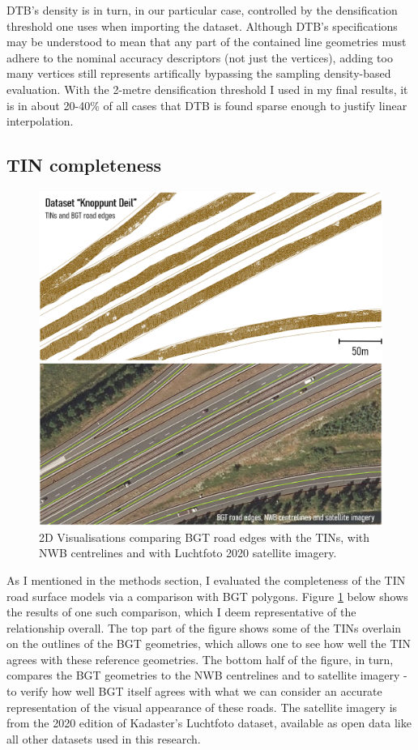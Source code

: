 DTB's density is in turn, in our particular case, controlled by the densification threshold one uses when importing the dataset. Although DTB's specifications may be understood to mean that any part of the contained line geometries must adhere to the nominal accuracy descriptors (not just the vertices), adding too many vertices still represents artifically bypassing the sampling density-based evaluation. With the 2-metre densification threshold I used in my final results, it is in about 20-40\% of all cases that DTB is found sparse enough to justify linear interpolation.

\subsection{TIN completeness}
\label{sub:tincompleteness}

\begin{figure}
    \centering
    \includegraphics[width=0.9\linewidth]{final_report/figs/bgtcomparison.png}
    \caption{2D Visualisations comparing BGT road edges with the TINs, with NWB centrelines and with Luchtfoto 2020 satellite imagery.}
    \label{fig:bgtcomparison}
\end{figure}

As I mentioned in the methods section, I evaluated the completeness of the TIN road surface models via a comparison with BGT polygons. Figure \ref{fig:bgtcomparison} below shows the results of one such comparison, which I deem representative of the relationship overall. The top part of the figure shows some of the TINs overlain on the outlines of the BGT geometries, which allows one to see how well the TIN agrees with these reference geometries. The bottom half of the figure, in turn, compares the BGT geometries to the NWB centrelines and to satellite imagery - to verify how well BGT itself agrees with what we can consider an accurate representation of the visual appearance of these roads. The satellite imagery is from the 2020 edition of Kadaster's Luchtfoto dataset, available as open data like all other datasets used in this research.

